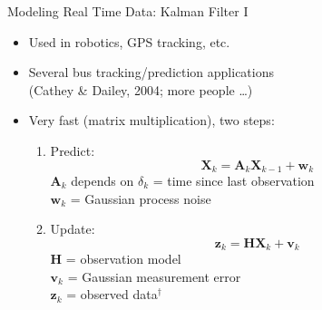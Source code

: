 \documentclass[10pt,t]{beamer}
\newcommand{\bX}{\mathbf{X}}
\newcommand{\mat}[1]{\mathbf{#1}}
\renewcommand{\vec}[1]{\boldsymbol{#1}}
\begin{document}
\begin{frame}{Modeling Real Time Data: Kalman Filter I}
  \onslide<+->
  \begin{itemize}[<+- | alert@+>]
    \item Used in robotics, GPS tracking, etc.

    \item Several bus tracking/prediction applications\\
      (Cathey \& Dailey, 2004; more people \ldots)

    \item Very fast (matrix multiplication), two steps:
      \begin{enumerate}
        \item Predict:
          \begin{equation*}
            \bX_k = \mat{A}_k \bX_{k-1} + \vec{w}_k
          \end{equation*}
          $\mat{A}_k$ depends on $\delta_k$ = time since last observation\\
          $\vec{w}_k$ = Gaussian process noise
        \item Update:
          \begin{equation*}
            \vec{z}_k = \mat{H} \bX_k + \vec{v}_k
          \end{equation*}
          $\mat{H} $ = observation model\\
          $\vec{v}_k$ = Gaussian measurement error\\
          $\vec{z}_k$ = observed data$^\dagger$
      \end{enumerate}
  \end{itemize}
  \onslide<+->
\end{frame}
\end{document}
